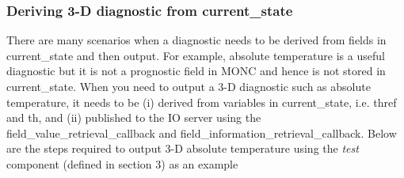 \documentclass[a4paper,11pt]{article}
\begin{document}
\subsubsection{Deriving 3-D diagnostic from current\_state}

There are many scenarios when a diagnostic needs to be derived from fields in
current\_state and then output. For example, absolute temperature is a useful
diagnostic but it is not a prognostic field in MONC and hence is not stored in
current\_state. When you need to output a 3-D diagnostic such as absolute
temperature, it needs to be (i) derived from variables in current\_state, i.e. thref
and th, and (ii) published to the IO server using
the field\_value\_retrieval\_callback and field\_information\_retrieval\_callback.
Below are the steps required to output 3-D absolute temperature using the
\emph{test} component (defined in section 3) as an example
\end{document}
